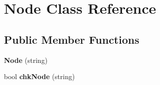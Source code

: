 \hypertarget{classNode}{\section{\-Node \-Class \-Reference}
\label{classNode}
}
\subsection*{\-Public \-Member \-Functions}
\begin{DoxyCompactItemize}
\item 
\hypertarget{classNode_a68f8682cfb96152c3d8dedd91168b4a5}{{\bfseries \-Node} (string)}\label{classNode_a68f8682cfb96152c3d8dedd91168b4a5}

\item 
\hypertarget{classNode_af70fb9f75495ef6c87cf37bd0cfbcb49}{bool {\bfseries chk\-Node} (string)}\label{classNode_af70fb9f75495ef6c87cf37bd0cfbcb49}

\end{DoxyCompactItemize}
